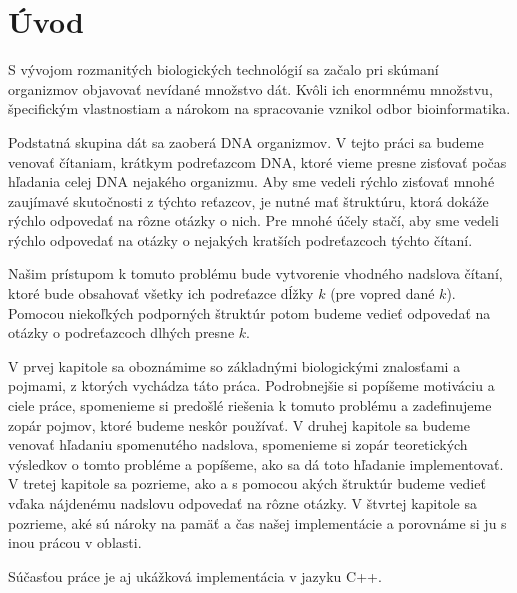 \chapter*{Úvod}

S vývojom rozmanitých biologických technológií sa začalo
pri skúmaní organizmov objavovať nevídané množstvo dát. Kvôli ich
enormnému množstvu, špecifickým vlastnostiam a nárokom na spracovanie
vznikol odbor bioinformatika.

Podstatná skupina dát sa zaoberá DNA organizmov. V tejto práci sa
budeme venovať čítaniam, krátkym podreťazcom DNA, ktoré vieme presne
zisťovať počas hľadania celej DNA nejakého organizmu. Aby sme vedeli
rýchlo zisťovať mnohé zaujímavé skutočnosti z týchto reťazcov, je
nutné mať štruktúru, ktorá dokáže rýchlo odpovedať na rôzne otázky
o nich. Pre mnohé účely stačí, aby sme vedeli rýchlo odpovedať na
otázky o nejakých kratších podreťazcoch týchto čítaní.

Našim prístupom k tomuto problému bude vytvorenie vhodného nadslova
čítaní, ktoré bude obsahovať všetky ich podreťazce dĺžky $k$ (pre vopred dané $k$).
Pomocou niekoľkých podporných štruktúr potom
budeme vedieť odpovedať na otázky o podreťazcoch dlhých presne $k$.

V prvej kapitole sa oboznámime so základnými biologickými znalosťami a pojmami,
z ktorých vychádza táto práca. Podrobnejšie si popíšeme motiváciu a ciele
práce, spomenieme si predošlé riešenia k tomuto problému a zadefinujeme
zopár pojmov, ktoré budeme neskôr používať.
V druhej kapitole sa budeme venovať hľadaniu spomenutého nadslova,
spomenieme si zopár teoretických výsledkov o tomto probléme
a popíšeme, ako sa dá toto hľadanie implementovať.
V tretej kapitole sa pozrieme, ako a s pomocou akých štruktúr budeme
vedieť vďaka nájdenému nadslovu odpovedať na rôzne otázky.
V štvrtej kapitole sa pozrieme, aké sú nároky na pamäť a čas našej
implementácie a porovnáme si ju s inou prácou v oblasti.

Súčasťou práce je aj ukážková implementácia v jazyku C++.
